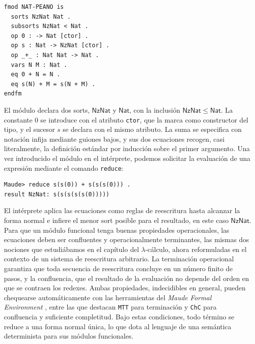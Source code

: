 \documentclass[a4paper,12pt]{report}
\theoremstyle{definition}
\theoremstyle{plain}
\theoremstyle{remark}
\begin{document}
\begin{lstlisting}
fmod NAT-PEANO is
  sorts NzNat Nat .
  subsorts NzNat < Nat .
  op 0 : -> Nat [ctor] .
  op s : Nat -> NzNat [ctor] .
  op _+_ : Nat Nat -> Nat .
  vars N M : Nat .
  eq 0 + N = N .
  eq s(N) + M = s(N + M) .
endfm
\end{lstlisting}

El m\'odulo declara dos sorts, $\mathsf{NzNat}$ y $\mathsf{Nat}$, con la inclusi\'on $\mathsf{NzNat} \leq \mathsf{Nat}$. La constante $0$ se introduce con el atributo \texttt{ctor}, que la marca como constructor del tipo, y el sucesor $s$ se declara con el mismo atributo. La suma se especifica con notaci\'on infija mediante guiones bajos, y sus dos ecuaciones recogen, casi literalmente, la definici\'on est\'andar por inducci\'on sobre el primer argumento. Una vez introducido el m\'odulo en el int\'erprete, podemos solicitar la evaluaci\'on de una expresi\'on mediante el comando \texttt{reduce}:

\begin{lstlisting}
Maude> reduce s(s(0)) + s(s(s(0))) .
result NzNat: s(s(s(s(s(0)))))
\end{lstlisting}

El int\'erprete aplica las ecuaciones como reglas de reescritura hasta alcanzar la forma normal e infiere el menor sort posible para el resultado, en este caso $\mathsf{NzNat}$.
\newline
\newline
Para que un m\'odulo funcional tenga buenas propiedades operacionales, las ecuaciones deben ser confluentes y operacionalmente terminantes, las mismas dos nociones que estudi\'abamos en el cap\'itulo del $\lambda$-c\'alculo, ahora reformuladas en el contexto de un sistema de reescritura arbitrario. La terminaci\'on operacional garantiza que toda secuencia de reescritura concluye en un n\'umero finito de pasos, y la confluencia, que el resultado de la evaluaci\'on no depende del orden en que se contraen los redexes. Ambas propiedades, indecidibles en general, pueden chequearse autom\'aticamente con las herramientas del \textit{Maude Formal Environment} \citep{duran2019}, entre las que destacan \texttt{MTT} para terminaci\'on y \texttt{ChC} para confluencia y suficiente completitud. Bajo estas condiciones, todo t\'ermino se reduce a una forma normal \'unica, lo que dota al lenguaje de una sem\'antica determinista para sus m\'odulos funcionales.
\end{document}
